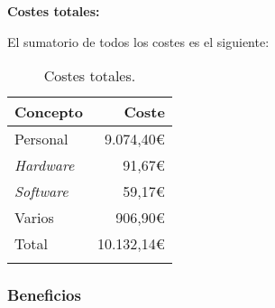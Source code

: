 \textbf{Costes totales:}

El sumatorio de todos los costes es el siguiente:

\begin{longtable}[]{@{}lr@{}}
\toprule
\begin{minipage}[b]{0.22\columnwidth}\raggedright\strut
\textbf{Concepto}\strut
\end{minipage} & \begin{minipage}[b]{0.22\columnwidth}\raggedright\strut
\textbf{Coste}\strut
\end{minipage}\tabularnewline
\midrule
\endhead
\begin{minipage}[t]{0.22\columnwidth}\raggedright\strut
Personal\strut
\end{minipage} & \begin{minipage}[t]{0.22\columnwidth}\raggedright\strut
9.074,40\euro{}\strut
\end{minipage}\tabularnewline
\begin{minipage}[t]{0.22\columnwidth}\raggedright\strut
\emph{Hardware}\strut
\end{minipage} & \begin{minipage}[t]{0.22\columnwidth}\raggedright\strut
91,67\euro{}\strut
\end{minipage}\tabularnewline
\begin{minipage}[t]{0.22\columnwidth}\raggedright\strut
\emph{Software}\strut
\end{minipage} & \begin{minipage}[t]{0.22\columnwidth}\raggedright\strut
59,17\euro{}\strut
\end{minipage}\tabularnewline
\begin{minipage}[t]{0.22\columnwidth}\raggedright\strut
Varios\strut
\end{minipage} & \begin{minipage}[t]{0.22\columnwidth}\raggedright\strut
906,90\euro{}\strut
\end{minipage}\tabularnewline
\midrule
\begin{minipage}[t]{0.22\columnwidth}\raggedright\strut
Total\strut
\end{minipage} & \begin{minipage}[t]{0.22\columnwidth}\raggedright\strut
10.132,14\euro{}\strut
\end{minipage}\tabularnewline
\bottomrule
\caption{Costes totales.}
\end{longtable}

\subsubsection{Beneficios}\label{beneficios}

